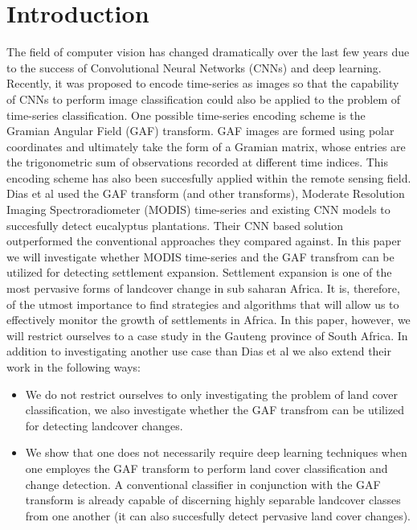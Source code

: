 \documentclass{article}
\begin{document}
\section{Introduction}
\label{sec:intro}
The field of computer vision has changed dramatically over the last few years due to the success of Convolutional Neural Networks (CNNs) and deep learning. Recently, it was proposed to encode time-series as images so that the capability of CNNs to perform image classification could also be applied to the problem of time-series classification. One possible time-series encoding scheme is the Gramian Angular Field (GAF) transform. GAF images are formed using polar coordinates and ultimately take the form of a Gramian matrix, whose entries are the trigonometric sum of observations recorded at different time indices. This encoding scheme has also been succesfully applied within the remote sensing field. Dias et al used the GAF transform (and other transforms), Moderate Resolution Imaging Spectroradiometer (MODIS) time-series and existing CNN models to succesfully detect eucalyptus plantations. Their CNN based solution outperformed the conventional approaches they compared against. In this paper we will investigate whether MODIS time-series and the GAF transfrom can be utilized for detecting settlement expansion. Settlement expansion is one of the most pervasive forms of landcover change in sub saharan Africa. It is, therefore, of the utmost importance to find strategies and algorithms that will allow us to effectively monitor the growth of settlements in Africa. In this paper, however, we will restrict ourselves to a case study in the Gauteng province of South Africa. In addition to investigating another use case than Dias et al we also extend their work in the following ways:
\begin{itemize}
 \item We do not restrict ourselves to only investigating the problem of land cover classification, we also investigate whether the GAF transfrom can be utilized for detecting landcover changes.
 \item We show that one does not necessarily require deep learning techniques when one employes the GAF transform to perform land cover classification and change detection. A conventional classifier in conjunction with the GAF transform is already capable of discerning highly separable landcover classes from one another (it can also succesfully detect pervasive land cover changes).
\end{itemize}
  
\end{document}
